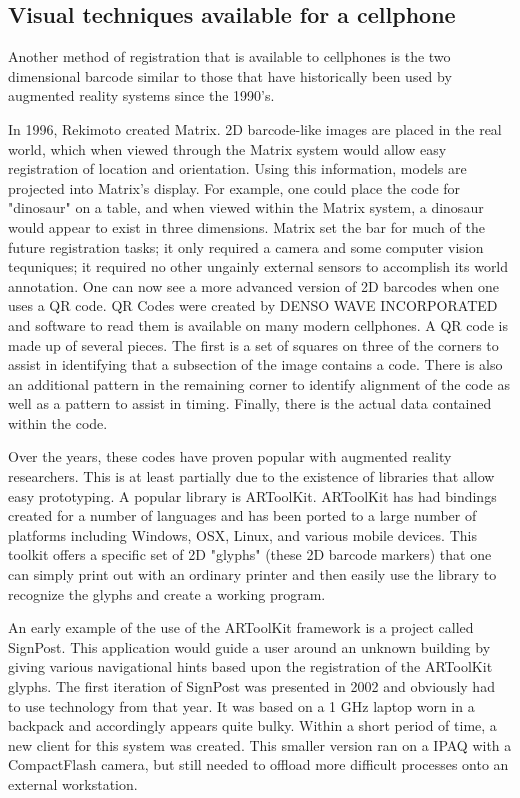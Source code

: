 \documentclass{acm_proc_article-sp}
\begin{document}
\subsection{Visual techniques available for a cellphone}

Another method of registration that is available to cellphones is the two dimensional barcode similar to those that have historically been used by augmented reality systems since the 1990's.

In 1996, Rekimoto created Matrix. 2D barcode-like images are placed in the real world, which when viewed through the Matrix system would allow easy registration of location and orientation. Using this information, models are projected into Matrix's display.  For example, one could place the code for "dinosaur" on a table, and when viewed within the Matrix system, a dinosaur would appear to exist in three dimensions. Matrix set the bar for much of the future registration tasks; it only required a camera and some computer vision tequniques; it required no other ungainly external sensors to accomplish its world annotation.\cite{rekimoto2002matrix}  One can now see a more advanced version of 2D barcodes when one uses a QR code. QR Codes were created by DENSO WAVE INCORPORATED and software to read them is available on many modern cellphones. \cite{nojiri2004two}  A QR code is made up of several pieces.  The first is a set of squares on three of the corners to assist in identifying that a subsection of the image contains a code. There is also an additional pattern in the remaining corner to identify alignment of the code as well as a pattern to assist in timing.  Finally, there is the actual data contained within the code. \cite{ohbuchi2004barcode}

Over the years, these codes have proven popular with augmented reality researchers.  This is at least partially due to the existence of libraries that allow easy prototyping. A popular library is ARToolKit. \cite{kato1999marker}  ARToolKit has had bindings created for a number of languages and has been ported to a large number of platforms including Windows, OSX, Linux, and various mobile devices.  This toolkit offers a specific set of 2D "glyphs" (these 2D barcode markers) that one can simply print out with an ordinary printer and then easily use the library to recognize the glyphs and create a working program.  \cite{hornecker2005using}

An early example of the use of the ARToolKit framework is a project called SignPost. \cite{kalkusch2002structured}   This application would guide a user around an unknown building by giving various navigational hints based upon the registration of the ARToolKit glyphs.  The first iteration of SignPost was presented in 2002 and obviously had to use technology from that year. It was based on a 1 GHz laptop worn in a backpack and accordingly appears quite bulky.  Within a short period of time, a new client for this system was created.  This smaller version ran on a IPAQ with a CompactFlash camera, but still needed to offload more difficult processes onto an external workstation. \cite{wagner2003first}
\end{document}
